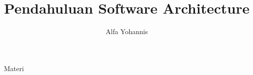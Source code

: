 \documentclass{beamer}
\title{Pendahuluan Software Architecture}
\author{Alfa Yohannis}
\begin{document}
\begin{frame}[plain]
    \maketitle
\end{frame}

\begin{frame}{Materi}
\end{frame}
\end{document}
